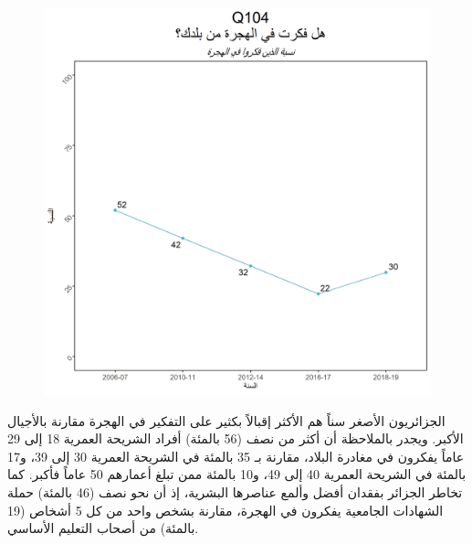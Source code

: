 \documentclass{article}
\begin{document}
	\begin{center}
		\begin{figure}[H]
			\centering
			\includegraphics[width=13cm]{Q104_.png}
		\end{figure}
	\end{center}
	
 الجزائريون الأصغر سناً هم الأكثر إقبالاً بكثير على التفكير في الهجرة مقارنة بالأجيال الأكبر. ويجدر بالملاحظة أن أكثر من نصف (56 بالمئة) أفراد الشريحة العمرية 18 إلى 29 عاماً يفكرون في مغادرة البلاد، مقارنة بـ 35 بالمئة في الشريحة العمرية 30 إلى 39، و17 بالمئة في الشريحة العمرية 40 إلى 49، و10 بالمئة ممن تبلغ أعمارهم 50 عاماً فأكبر. كما تخاطر الجزائر بفقدان أفضل وألمع عناصرها البشرية، إذ أن نحو نصف (46 بالمئة) حملة الشهادات الجامعية يفكرون في الهجرة، مقارنة بشخص واحد من كل 5 أشخاص (19 بالمئة) من أصحاب التعليم الأساسي.

    
\end{document}
